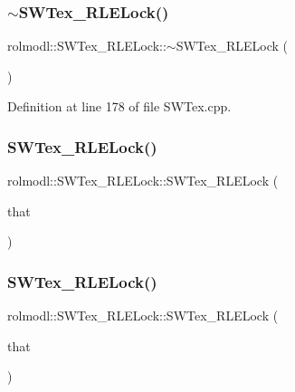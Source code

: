 \subsubsection{\texorpdfstring{$\sim$SWTex\_RLELock()}{~SWTex\_RLELock()}}
{\footnotesize\ttfamily rolmodl\+::\+S\+W\+Tex\+\_\+\+R\+L\+E\+Lock\+::$\sim$\+S\+W\+Tex\+\_\+\+R\+L\+E\+Lock (\begin{DoxyParamCaption}{ }\end{DoxyParamCaption})\hspace{0.3cm}{\ttfamily [noexcept]}}



Definition at line 178 of file S\+W\+Tex.\+cpp.

\mbox{\label{classrolmodl_1_1_s_w_tex___r_l_e_lock_a9d2bd5da21ba4e367db580207fb17ef6}} 
\subsubsection{\texorpdfstring{SWTex\_RLELock()}{SWTex\_RLELock()}\hspace{0.1cm}{\footnotesize\ttfamily [2/3]}}
{\footnotesize\ttfamily rolmodl\+::\+S\+W\+Tex\+\_\+\+R\+L\+E\+Lock\+::\+S\+W\+Tex\+\_\+\+R\+L\+E\+Lock (\begin{DoxyParamCaption}\item[{const \mbox{\hyperlink{classrolmodl_1_1_s_w_tex___r_l_e_lock}{S\+W\+Tex\+\_\+\+R\+L\+E\+Lock}} \&}]{that }\end{DoxyParamCaption})\hspace{0.3cm}{\ttfamily [delete]}}

\mbox{\label{classrolmodl_1_1_s_w_tex___r_l_e_lock_a317e3a109db6b3c5f1cd5645b81f712e}} 
\subsubsection{\texorpdfstring{SWTex\_RLELock()}{SWTex\_RLELock()}\hspace{0.1cm}{\footnotesize\ttfamily [3/3]}}
{\footnotesize\ttfamily rolmodl\+::\+S\+W\+Tex\+\_\+\+R\+L\+E\+Lock\+::\+S\+W\+Tex\+\_\+\+R\+L\+E\+Lock (\begin{DoxyParamCaption}\item[{\mbox{\hyperlink{classrolmodl_1_1_s_w_tex___r_l_e_lock}{S\+W\+Tex\+\_\+\+R\+L\+E\+Lock}} \&\&}]{that }\end{DoxyParamCaption})\hspace{0.3cm}{\ttfamily [noexcept]}}




